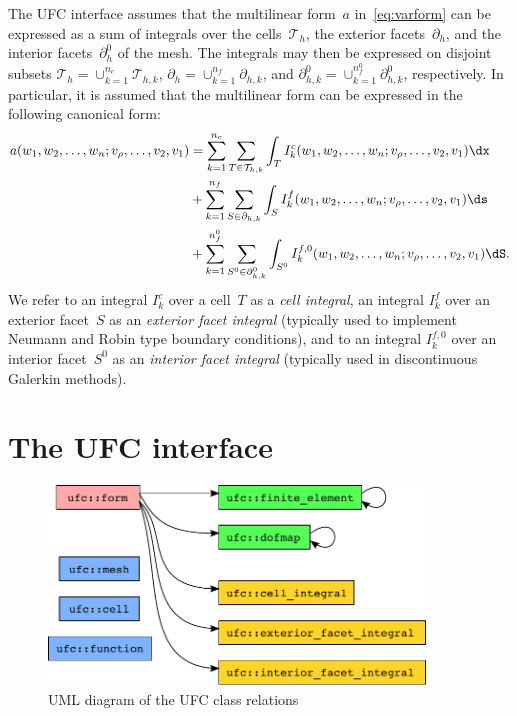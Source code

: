 The UFC interface assumes that the multilinear form~$a$
in~\eqref{eq:varform} can be expressed as a sum of integrals over the
cells~$\mathcal{T}_h$, the exterior facets~$\partial_h$, and the
interior facets~$\partial_h^0$ of the mesh. The integrals may then be
expressed on disjoint subsets $\mathcal{T}_h = \cup_{k=1}^{n_c}
\mathcal{T}_{h,k}$, $\partial_h = \cup_{k=1}^{n_f} \partial_{h,k}$,
and $\partial_{h,k}^0 = \cup_{k=1}^{n_f^0} \partial_{h,k}^0$,
respectively. In particular, it is assumed that the multilinear form
can be expressed in the following canonical form:
\begin{equation} \label{eq:form_integrals}
  \begin{split}
    a(w_1, w_2, \ldots, w_n; v_{\rho}, \ldots, v_2, v_1)
    &=
    \sum_{k=1}^{n_c} \sum_{T\in\mathcal{T}_{h,k}} \int_{T}
    I^c_k(w_1, w_2, \ldots, w_n; v_{\rho}, \ldots, v_2, v_1) \dx \\
    &+
    \sum_{k=1}^{n_f} \sum_{S\in\partial_{h,k}} \int_{S}
    I^f_k(w_1, w_2, \ldots, w_n; v_{\rho}, \ldots, v_2, v_1) \ds \\
    &+
    \sum_{k=1}^{n_f^0} \sum_{S^0\in\partial_{h,k}^0} \int_{S^0}
    I^{f,0}_k(w_1, w_2, \ldots, w_n; v_{\rho}, \ldots, v_2, v_1) \dS.
  \end{split}
\end{equation}
We refer to an integral $I^c_k$ over a cell~$T$ as a \emph{cell
  integral}, an integral $I^f_k$ over an exterior facet~$S$ as an
\emph{exterior facet integral} (typically used to implement Neumann
and Robin type boundary conditions), and to an integral $I^{f,0}_k$
over an interior facet~$S^0$ as an \emph{interior facet integral}
(typically used in discontinuous Galerkin methods).

\section{The UFC interface}
\label{sec:alnes-2:ufc:syntax}

\begin{figure}
  \begin{center}
    \includegraphics[width=10cm]{chapters/alnes-2/pdf/ufc_classes.pdf}
    \caption{UML diagram of the UFC class relations}
    \label{fig:uml}
  \end{center}
\end{figure}

